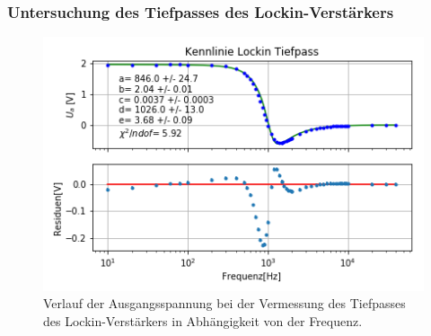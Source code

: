 \documentclass[12pt,a4paper]{article}
\begin{document}
\subsubsection{Untersuchung des Tiefpasses des Lockin-Verstärkers}

\begin{figure}
\centering
\includegraphics[scale=1]{Bilder/Vorversuch2/KennlinieTiefpass.png}
\caption[test]{Verlauf der Ausgangsspannung bei der Vermessung des Tiefpasses des Lockin-Verstärkers in Abhängigkeit von der Frequenz.}
\label{fig:LockinTiefpass_Verlauf}
\end{figure}
\end{document}
